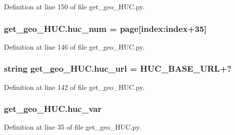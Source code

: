 Definition at line 150 of file get\+\_\+geo\+\_\+\+H\+U\+C.\+py.

\subsubsection[{\texorpdfstring{huc\+\_\+num}{huc_num}}]{\setlength{\rightskip}{0pt plus 5cm}get\+\_\+geo\+\_\+\+H\+U\+C.\+huc\+\_\+num = {\bf page}\mbox{[}index\+:index+35\mbox{]}}\hypertarget{namespaceget__geo___h_u_c_a67ca2e90497c71a6704c6755bca3082b}{}\label{namespaceget__geo___h_u_c_a67ca2e90497c71a6704c6755bca3082b}


Definition at line 146 of file get\+\_\+geo\+\_\+\+H\+U\+C.\+py.

\subsubsection[{\texorpdfstring{huc\+\_\+url}{huc_url}}]{\setlength{\rightskip}{0pt plus 5cm}string get\+\_\+geo\+\_\+\+H\+U\+C.\+huc\+\_\+url = {\bf H\+U\+C\+\_\+\+B\+A\+S\+E\+\_\+\+U\+RL}+\textquotesingle{}?\textquotesingle{}}\hypertarget{namespaceget__geo___h_u_c_a116c62a95390733e5851cce08e203e01}{}\label{namespaceget__geo___h_u_c_a116c62a95390733e5851cce08e203e01}


Definition at line 142 of file get\+\_\+geo\+\_\+\+H\+U\+C.\+py.

\subsubsection[{\texorpdfstring{huc\+\_\+var}{huc_var}}]{\setlength{\rightskip}{0pt plus 5cm}get\+\_\+geo\+\_\+\+H\+U\+C.\+huc\+\_\+var}\hypertarget{namespaceget__geo___h_u_c_a68717ed78e37a7292f01cf4e97c95e9f}{}\label{namespaceget__geo___h_u_c_a68717ed78e37a7292f01cf4e97c95e9f}


Definition at line 35 of file get\+\_\+geo\+\_\+\+H\+U\+C.\+py.

